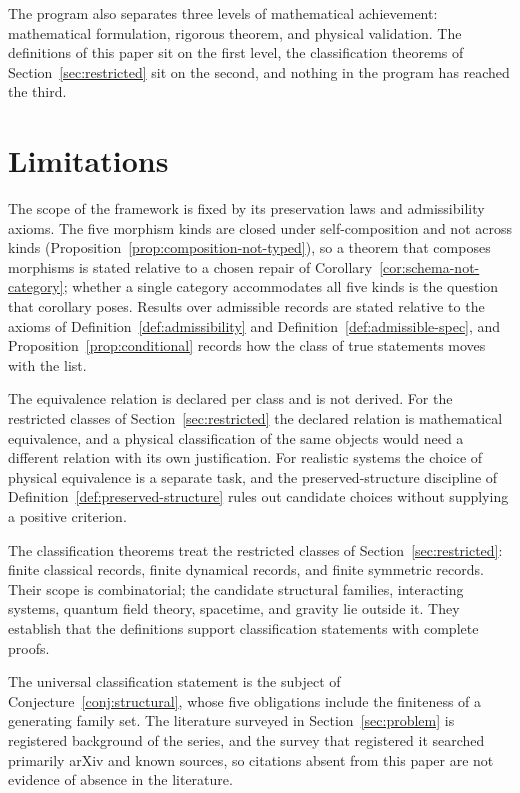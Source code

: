 \documentclass[11pt,letterpaper]{article}
\theoremstyle{definition}
\theoremstyle{remark}
\begin{document}
The program also separates three levels of mathematical achievement: mathematical formulation, rigorous theorem, and physical validation. The definitions of this paper sit on the first level, the classification theorems of Section~\ref{sec:restricted} sit on the second, and nothing in the program has reached the third.

\section{Limitations}
\label{sec:limitations}

The scope of the framework is fixed by its preservation laws and admissibility axioms. The five morphism kinds are closed under self-composition and not across kinds (Proposition~\ref{prop:composition-not-typed}), so a theorem that composes morphisms is stated relative to a chosen repair of Corollary~\ref{cor:schema-not-category}; whether a single category accommodates all five kinds is the question that corollary poses. Results over admissible records are stated relative to the axioms of Definition~\ref{def:admissibility} and Definition~\ref{def:admissible-spec}, and Proposition~\ref{prop:conditional} records how the class of true statements moves with the list.

The equivalence relation is declared per class and is not derived. For the restricted classes of Section~\ref{sec:restricted} the declared relation is mathematical equivalence, and a physical classification of the same objects would need a different relation with its own justification. For realistic systems the choice of physical equivalence is a separate task, and the preserved-structure discipline of Definition~\ref{def:preserved-structure} rules out candidate choices without supplying a positive criterion.

The classification theorems treat the restricted classes of Section~\ref{sec:restricted}: finite classical records, finite dynamical records, and finite symmetric records. Their scope is combinatorial; the candidate structural families, interacting systems, quantum field theory, spacetime, and gravity lie outside it. They establish that the definitions support classification statements with complete proofs.

The universal classification statement is the subject of Conjecture~\ref{conj:structural}, whose five obligations include the finiteness of a generating family set. The literature surveyed in Section~\ref{sec:problem} is registered background of the series, and the survey that registered it searched primarily arXiv and known sources, so citations absent from this paper are not evidence of absence in the literature.
\end{document}
